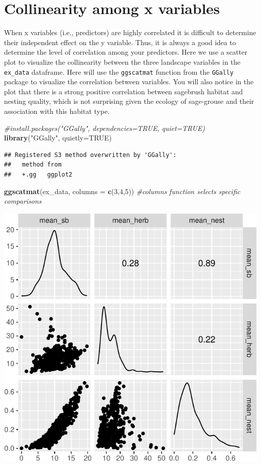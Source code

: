 \documentclass[
]{book}
\newenvironment{Shaded}{\begin{snugshade}}{\end{snugshade}}
\newcommand{\AttributeTok}[1]{\textcolor[rgb]{0.13,0.29,0.53}{#1}}
\newcommand{\CommentTok}[1]{\textcolor[rgb]{0.56,0.35,0.01}{\textit{#1}}}
\newcommand{\ConstantTok}[1]{\textcolor[rgb]{0.56,0.35,0.01}{#1}}
\newcommand{\DecValTok}[1]{\textcolor[rgb]{0.00,0.00,0.81}{#1}}
\newcommand{\FunctionTok}[1]{\textcolor[rgb]{0.13,0.29,0.53}{\textbf{#1}}}
\newcommand{\NormalTok}[1]{#1}
\newcommand{\StringTok}[1]{\textcolor[rgb]{0.31,0.60,0.02}{#1}}
\begin{document}
\hypertarget{collinearity-among-x-variables}{%
\section{Collinearity among x variables}\label{collinearity-among-x-variables}}

When x variables (i.e., predictors) are highly correlated it is difficult to determine their independent effect on the y variable. Thus, it is always a good idea to determine the level of correlation among your predictors. Here we use a scatter plot to visualize the collinearity between the three landscape variables in the \texttt{ex\_data} dataframe. Here will use the \texttt{ggscatmat} function from the \texttt{GGally} package to visualize the correlation between variables. You will also notice in the plot that there is a strong positive correlation between sagebrush habitat and nesting quality, which is not surprising given the ecology of sage-grouse and their association with this habitat type.

\begin{Shaded}
\begin{Highlighting}[]
\CommentTok{\#install.packages("GGally", dependencies=TRUE, quiet=TRUE) }
\FunctionTok{library}\NormalTok{(}\StringTok{"GGally"}\NormalTok{, }\AttributeTok{quietly=}\ConstantTok{TRUE}\NormalTok{)}
\end{Highlighting}
\end{Shaded}

\begin{verbatim}
## Registered S3 method overwritten by 'GGally':
##   method from   
##   +.gg   ggplot2
\end{verbatim}

\begin{Shaded}
\begin{Highlighting}[]
\FunctionTok{ggscatmat}\NormalTok{(ex\_data, }\AttributeTok{columns =} \FunctionTok{c}\NormalTok{(}\DecValTok{3}\NormalTok{,}\DecValTok{4}\NormalTok{,}\DecValTok{5}\NormalTok{)) }\CommentTok{\#columns function selects specific comparisons}
\end{Highlighting}
\end{Shaded}

\includegraphics{series_files/figure-latex/unnamed-chunk-37-1.pdf}
\end{document}
